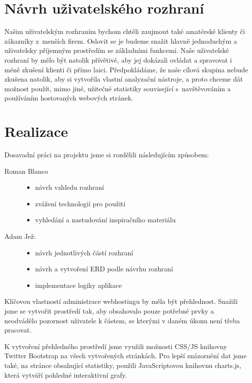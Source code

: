 \documentclass[11pt,a4paper]{article}
\begin{document}
  \section{Návrh uživatelského rozhraní}

    Našim uživatelským rozhraním bychom chtěli zaujmout také amatérské
    klienty či zákazníky z~menších firem. Oslovit se je budeme snažit
    hlavně jednoduchým a uživatelsky příjemným prostředím se základními funkcemi.
    Naše uživatelské rozhraní by mělo být natolik přívětivé, aby
    jej dokázali ovládat a spravovat i méně zkušení klienti či přímo laici.
    Předpokládáme, že naše cílová skupina nebude zkušena natolik, aby si
    vytvořila vlastní analyzační nástroje, a proto chceme dát možnost použít, mimo jiné,
    užitečné statistiky související s~navštěvováním a používáním hostovaných
    webových stránek.

  \section{Realizace}

    Dosavadní práci na projektu jsme si rozdělili následujícím způsobem:
    \begin{description}
      \item[Roman Blanco] \hfill
        \begin{itemize}
          \item návrh vzhledu rozhraní
          \item zvážení technologií pro použití
          \item vyhledání a nastudování inspiračního materiálu
        \end{itemize}
      \item[Adam Jež:] \hfill
        \begin{itemize}
          \item návrh jednotlivých částí rozhraní
          \item návrh a vytvoření ERD podle návrhu rozhraní
          \item implementace logiky aplikace
        \end{itemize}
    \end{description}

    Klíčovou vlastností administrace webhostingu by měla být přehlednost. Snažili jsme se
    vytvořit prostředí tak, aby obsahovalo pouze potřebné prvky a neodvádělo
    pozornost uživatele k částem, se kterými v daném úkonu není třeba pracovat.

    K vytvoření přehledného prostředí jsme využili možnosti CSS/JS knihovny
    Twitter Bootstrap na všech vytvořených stránkách.
    Pro lepší znázornění dat jsme také, na stránce obsahující statistiky, použili
    JavaScriptovou knihovnu charts.js, která vytváří pohledné interaktivní grafy.
\end{document}
